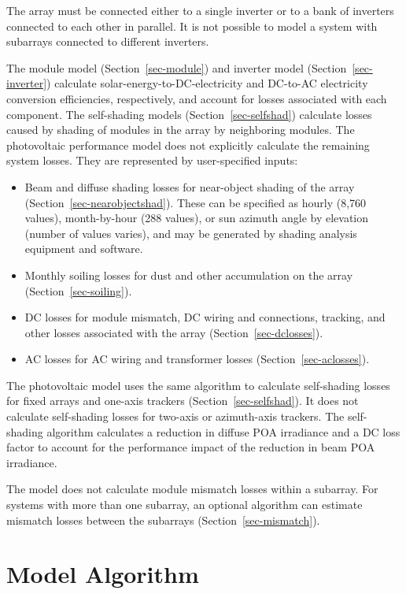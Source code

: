 \documentclass[12pt,letterpaper]{article}
\begin{document}
The array must be connected either to a single inverter or to a bank of inverters connected to each other in parallel. It is not possible to model a system with subarrays connected to different inverters.

The module model (Section~\ref{sec-module}) and inverter model (Section~\ref{sec-inverter}) calculate solar-energy-to-DC-electricity and DC-to-AC electricity conversion efficiencies, respectively, and account for losses associated with each component. The self-shading models (Section~\ref{sec-selfshad}) calculate losses caused by shading of modules in the array by neighboring modules. The photovoltaic performance model does not explicitly calculate the remaining system losses. They are represented by user-specified inputs:

\begin{itemize}
\item{Beam and diffuse shading losses for near-object shading of the array (Section~\ref{sec-nearobjectshad}). These can be specified as hourly (8,760 values), month-by-hour (288 values), or sun azimuth angle by elevation (number of values varies), and may be generated by shading analysis equipment and software.}
\item{Monthly soiling losses for dust and other accumulation on the array (Section~\ref{sec-soiling}).}
\item{DC losses for module mismatch, DC wiring and connections, tracking, and other losses associated with the array (Section~\ref{sec-dclosses}).}
\item{AC losses for AC wiring and transformer losses (Section~\ref{sec-aclosses}).}
\end{itemize}

The photovoltaic model uses the same algorithm to calculate self-shading losses for fixed arrays and one-axis trackers (Section~\ref{sec-selfshad}). It does not calculate self-shading losses for two-axis or azimuth-axis trackers. The self-shading algorithm calculates a reduction in diffuse POA irradiance and a DC loss factor to account for the performance impact of the reduction in beam POA irradiance.

The model does not calculate module mismatch losses within a subarray. For systems with more than one subarray, an optional algorithm can estimate mismatch losses between the subarrays (Section~\ref{sec-mismatch}).

\section{Model Algorithm}
\end{document}
